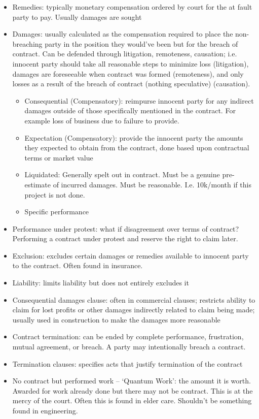 \documentclass[10pt]{article}
\begin{document}
\begin{itemize}
	\item Remedies: typically monetary compensation ordered by court for the at fault party to pay.  Usually damages are sought
	\item Damages: usually calculated as the compensation required to place the non-breaching party in the position they would've been but for the breach of contract. Can be defended through litigation, remoteness, causation; i.e. innocent party should take all reasonable steps to minimize loss (litigation), damages are foreseeable when contract was formed (remoteness), and only losses as a result of the breach of contract (nothing speculative) (causation).
		\begin{itemize}
			\item Consequential (Compensatory): reimpurse innocent party for any indirect damages outside of those specifically mentioned in the contract. For example loss of business due to failure to provide.
			\item Expectation (Compensatory):  provide the innocent party the amounts they expected to obtain from the contract, done based upon contractual terms or market value
			\item Liquidated: Generally spelt out in contract. Must be a genuine pre-estimate of incurred damages. Must be reasonable. I.e. 10k/month if this project is not done.
			\item Specific performance
		\end{itemize}
	\item Performance under protest: what if disagreement over terms of contract? Performing a contract under protest and reserve the right to claim later.
	\item Exclusion: excludes certain damages or remedies available to innocent party to the contract. Often found in insurance.
	\item Liability: limits liability but does not entirely excludes it
	\item Consequential damages clause: often in commercial clauses; restricts ability to claim for lost profits or other damages indirectly 	related to claim being made;  usually used in construction to make the damages more reasonable
	\item Contract termination: can be ended by complete performance, frustration, mutual agreement, or breach. A party may intentionally breach a contract. 
	\item Termination clauses: specifies acts that justify termination of the contract
	\item No contract but performed work -- `Quantum Work': the amount it is worth. Awarded for work already done but there may not be contract. This is at the mercy of the court. Often this is found in elder care. Shouldn't be something found in engineering.
\end{itemize}
\end{document}
